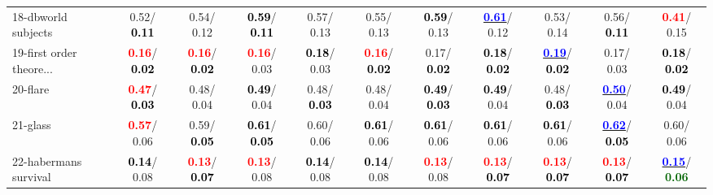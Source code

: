 \begin{table}[h]
\begin{center}
{\begin{tabular}{lc|c|c|c|c|c|c|c|c|c}
18-dbworld subjects &   0.52/\textcolor{black}{\textbf{  0.11}} &   0.54/  0.12 & \textcolor{black}{\textbf{  0.59}}/\textcolor{black}{\textbf{  0.11}} &   0.57/  0.13 &   0.55/  0.13 & \textcolor{black}{\textbf{  0.59}}/  0.13 & \underline{\textcolor{blue}{\textbf{  0.61}}}/  0.12 &   0.53/  0.14 &   0.56/\textcolor{black}{\textbf{  0.11}} & \textcolor{red}{\textbf{  0.41}}/  0.15 \\
19-first order theore... & \textcolor{red}{\textbf{  0.16}}/\textcolor{black}{\textbf{  0.02}} & \textcolor{red}{\textbf{  0.16}}/\textcolor{black}{\textbf{  0.02}} & \textcolor{red}{\textbf{  0.16}}/  0.03 & \textcolor{black}{\textbf{  0.18}}/  0.03 & \textcolor{red}{\textbf{  0.16}}/\textcolor{black}{\textbf{  0.02}} &   0.17/\textcolor{black}{\textbf{  0.02}} & \textcolor{black}{\textbf{  0.18}}/\textcolor{black}{\textbf{  0.02}} & \underline{\textcolor{blue}{\textbf{  0.19}}}/\textcolor{black}{\textbf{  0.02}} &   0.17/  0.03 & \textcolor{black}{\textbf{  0.18}}/\textcolor{black}{\textbf{  0.02}} \\
20-flare & \textcolor{red}{\textbf{  0.47}}/\textcolor{black}{\textbf{  0.03}} &   0.48/  0.04 & \textcolor{black}{\textbf{  0.49}}/  0.04 &   0.48/\textcolor{black}{\textbf{  0.03}} &   0.48/  0.04 & \textcolor{black}{\textbf{  0.49}}/\textcolor{black}{\textbf{  0.03}} & \textcolor{black}{\textbf{  0.49}}/  0.04 &   0.48/\textcolor{black}{\textbf{  0.03}} & \underline{\textcolor{blue}{\textbf{  0.50}}}/  0.04 & \textcolor{black}{\textbf{  0.49}}/  0.04 \\
21-glass & \textcolor{red}{\textbf{  0.57}}/  0.06 &   0.59/\textcolor{black}{\textbf{  0.05}} & \textcolor{black}{\textbf{  0.61}}/\textcolor{black}{\textbf{  0.05}} &   0.60/  0.06 & \textcolor{black}{\textbf{  0.61}}/  0.06 & \textcolor{black}{\textbf{  0.61}}/  0.06 & \textcolor{black}{\textbf{  0.61}}/  0.06 & \textcolor{black}{\textbf{  0.61}}/  0.06 & \underline{\textcolor{blue}{\textbf{  0.62}}}/\textcolor{black}{\textbf{  0.05}} &   0.60/  0.06 \\ \hline
22-habermans survival & \textcolor{black}{\textbf{  0.14}}/  0.08 & \textcolor{red}{\textbf{  0.13}}/\textcolor{black}{\textbf{  0.07}} & \textcolor{red}{\textbf{  0.13}}/  0.08 & \textcolor{black}{\textbf{  0.14}}/  0.08 & \textcolor{black}{\textbf{  0.14}}/  0.08 & \textcolor{red}{\textbf{  0.13}}/  0.08 & \textcolor{red}{\textbf{  0.13}}/\textcolor{black}{\textbf{  0.07}} & \textcolor{red}{\textbf{  0.13}}/\textcolor{black}{\textbf{  0.07}} & \textcolor{red}{\textbf{  0.13}}/\textcolor{black}{\textbf{  0.07}} & \underline{\textcolor{blue}{\textbf{  0.15}}}/\textcolor{darkgreen}{\textbf{  0.06}} \\

\end{tabular}}
\end{center}
\end{table}
